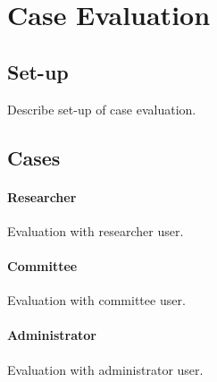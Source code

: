 \section{Case Evaluation}
\subsection{Set-up}
Describe set-up of case evaluation.
\subsection{Cases}
\paragraph{Researcher}
Evaluation with researcher user.
\paragraph{Committee}
Evaluation with committee user.
\paragraph{Administrator}
Evaluation with administrator user.